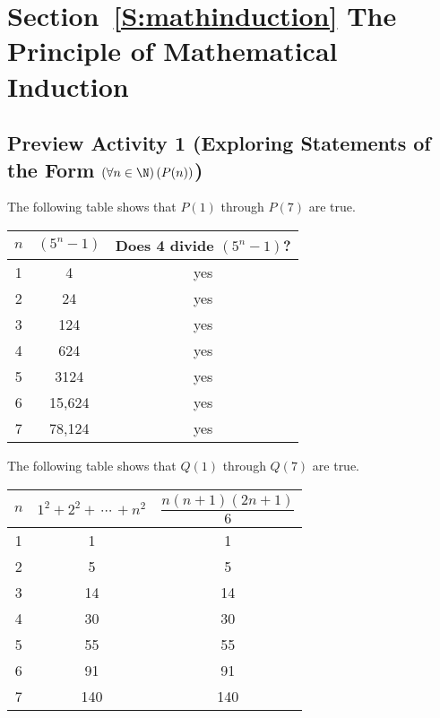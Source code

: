 \section*{Section~\ref{S:mathinduction} The Principle of Mathematical Induction}

\subsection*{Preview Activity 1 \textbf{(Exploring Statements of the Form  $\left( \forall n \in \N \right)\left( P(n) \right)$)}}
The following table shows that $P(1)$ through $P(7)$ are true.
\begin{center}
\begin{tabular}[t]{| c | c | c |} \hline
$n$  &  $\left( {5^n - 1} \right)$  &  Does 4 divide $\left( {5^n - 1} \right)$? \\ \hline
1  &  4  &  yes  \\ \hline
2  &  24  &  yes \\ \hline
3  &  124  &  yes  \\ \hline
4  &  624  &  yes  \\ \hline
5  &  3124  &  yes \\ \hline
6  &  15,624  &  yes  \\ \hline
7  &  78,124  &  yes  \\ \hline
\end{tabular}
\end{center}
The following table shows that $Q(1)$ through $Q(7)$ are true.
\begin{center}
\begin{tabular}[t]{| c | c | c |} \hline
$n$  &  $1^2  + 2^2  + \, \cdots \, + n^2 $  &  $\dfrac{{n(n + 1)(2n + 1)}}{6}$ \\ \hline
1  &  1  &  1  \\ \hline
2  &  5  &  5 \\ \hline
3  &  14  &  14  \\ \hline
4  &  30  &  30  \\ \hline
5  &  55  &  55 \\ \hline
6  &  91  &  91  \\ \hline
7  &  140  &  140  \\ \hline
\end{tabular}
\end{center}

